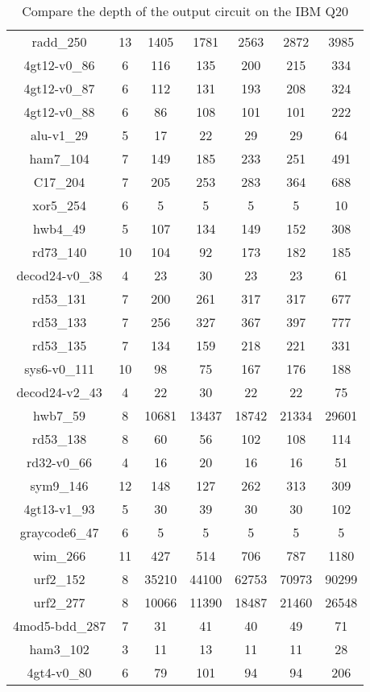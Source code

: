 \documentclass[runningheads]{llncs}
\begin{document}
\begin{table}[H]
\begin{center}
\begin{tabular}{|c|c|c|c|c|c|c|}
radd\_250 & 13 & 1405 & 1781 & 2563 & 2872 & 3985 \\
4gt12-v0\_86 & 6 & 116 & 135 & 200 & 215 & 334 \\
4gt12-v0\_87 & 6 & 112 & 131 & 193 & 208 & 324 \\
4gt12-v0\_88 & 6 & 86 & 108 & 101 & 101 & 222 \\
alu-v1\_29 & 5 & 17 & 22 & 29 & 29 & 64 \\
ham7\_104 & 7 & 149 & 185 & 233 & 251 & 491 \\
C17\_204 & 7 & 205 & 253 & 283 & 364 & 688 \\
xor5\_254 & 6 & 5 & 5 & 5 & 5 & 10 \\
hwb4\_49 & 5 & 107 & 134 & 149 & 152 & 308 \\
rd73\_140 & 10 & 104 & 92 & 173 & 182 & 185 \\
decod24-v0\_38 & 4 & 23 & 30 & 23 & 23 & 61 \\
rd53\_131 & 7 & 200 & 261 & 317 & 317 & 677 \\
rd53\_133 & 7 & 256 & 327 & 367 & 397 & 777 \\
rd53\_135 & 7 & 134 & 159 & 218 & 221 & 331 \\
sys6-v0\_111 & 10 & 98 & 75 & 167 & 176 & 188 \\
decod24-v2\_43 & 4 & 22 & 30 & 22 & 22 & 75 \\
hwb7\_59 & 8 & 10681 & 13437 & 18742 & 21334 & 29601 \\
rd53\_138 & 8 & 60 & 56 & 102 & 108 & 114 \\
rd32-v0\_66 & 4 & 16 & 20 & 16 & 16 & 51 \\
sym9\_146 & 12 & 148 & 127 & 262 & 313 & 309 \\
4gt13-v1\_93 & 5 & 30 & 39 & 30 & 30 & 102 \\
graycode6\_47 & 6 & 5 & 5 & 5 & 5 & 5 \\
wim\_266 & 11 & 427 & 514 & 706 & 787 & 1180 \\
urf2\_152 & 8 & 35210 & 44100 & 62753 & 70973 & 90299 \\
urf2\_277 & 8 & 10066 & 11390 & 18487 & 21460 & 26548 \\
4mod5-bdd\_287 & 7 & 31 & 41 & 40 & 49 & 71 \\
ham3\_102 & 3 & 11 & 13 & 11 & 11 & 28 \\
4gt4-v0\_80 & 6 & 79 & 101 & 94 & 94 & 206 \\
					\hline
						\end{tabular} 
						\end{center} 	
						\caption{Compare the depth of the output circuit on the IBM Q20} 
						\label{tab6}
					\end{table}
\end{document}
